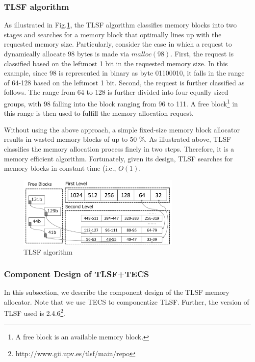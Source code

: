 \documentclass[JIP]{ipsj_v2/UTF8/ipsj}
\begin{document}
\subsubsection{TLSF algorithm}

As illustrated in Fig.\ref{fig:TLSF}, the TLSF algorithm classifies memory blocks into two stages and searches for a memory block that optimally lines up with the requested memory size.
Particularly, consider the case in which a request to dynamically allocate 98 bytes is made via $malloc(98)$.
First, the request is classified based on the leftmost 1 bit in the requested memory size.
In this example, since 98 is represented in binary as byte 01100010, it falls in the range of 64-128 based on the leftmost 1 bit.
Second, the request is further classified as follows.
The range from 64 to 128 is further divided into four equally sized groups, with 98 falling into the block ranging from 96 to 111.
A free block\footnote{A free block is an available memory block.} in this range is then used to fulfill the memory allocation request.

Without using the above approach, a simple fixed-size memory block allocator results in wasted memory blocks of up to 50 \%.
As illustrated above, TLSF classifies the memory allocation process finely in two steps.
Therefore, it is a memory efficient algorithm.
Fortunately, given its design, TLSF searches for memory blocks in constant time (i.e., $O(1)$.


\begin{figure}[t]
    \centering
    \includegraphics[width=8cm,clip]{figure/TLSF.pdf}
    \caption{TLSF algorithm}
    \label{fig:TLSF}
\end{figure}


\subsubsection{Component Design of TLSF+TECS}

In this subsection, we describe the component design of the TLSF memory allocator.
Note that we use TECS to componentize TLSF.
Further, the version of TLSF used is 2.4.6\footnote{http://www.gii.upv.es/tlsf/main/repo}.
\end{document}
